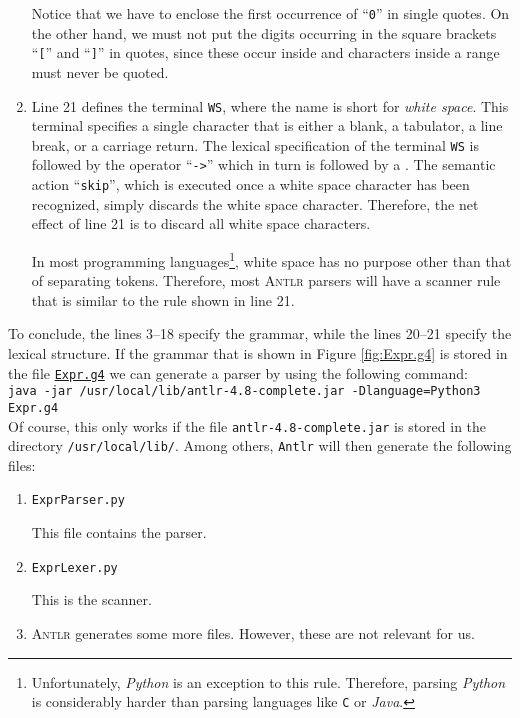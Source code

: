 \begin{enumerate}
      Notice that we have to enclose the first occurrence of ``\texttt{0}'' in single quotes.
      On the other hand, we must not put the digits occurring in the square brackets ``\texttt{[}'' 
      and ``\texttt{]}'' in quotes, since these occur inside  and characters inside a range
      must never be quoted.
\item Line 21 defines the terminal \texttt{WS}, where the name is short for \emph{white space}. This terminal
      specifies a single character that is either a blank, a tabulator, a line break, or a carriage return.
      The lexical specification of the terminal \texttt{WS} is followed by the operator ``\texttt{->}'' 
      which in turn is followed by a .
      The semantic action ``\texttt{skip}'', which is executed once a white space character has been recognized, 
      simply discards the white space character.  Therefore, the net effect of line 21 is to discard all white
      space characters. 

      In most programming languages\footnote{
        Unfortunately, \textsl{Python} is an exception to this rule.  Therefore, parsing
        \textsl{Python} is considerably harder than parsing languages like \texttt{C} or \textsl{Java}.
      }, white space has no purpose other than that of separating  tokens.  
      Therefore, most \textsc{Antlr} parsers will have a scanner rule that is similar to
      the rule shown in line 21. 
\end{enumerate}
To conclude, the lines 3--18 specify the grammar, while the lines 20--21 specify the 
lexical structure.  If the grammar that is shown in Figure \ref{fig:Expr.g4} is stored in the file
\href{https://github.com/karlstroetmann/Formal-Languages/blob/master/ANTLR4-Python/PureExprParser/Expr.g4}{\texttt{Expr.g4}} 
we can generate a parser by using the following command:
\\[0.2cm]
\hspace*{1.3cm}
\texttt{java -jar /usr/local/lib/antlr-4.8-complete.jar -Dlanguage=Python3 Expr.g4}
\\[0.2cm]
Of course, this only works if the file \texttt{antlr-4.8-complete.jar} is stored in the directory
\texttt{/usr/local/lib/}.  Among others, \texttt{Antlr} will then generate the following files:
\begin{enumerate}
\item \texttt{ExprParser.py}

      This file contains the parser.
\item \texttt{ExprLexer.py}

      This is the scanner.
\item \textsc{Antlr} generates some more files.  However, these are not relevant for us.
\end{enumerate}

